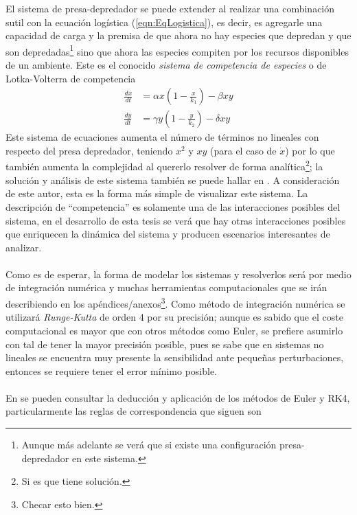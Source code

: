 El sistema de presa-depredador se puede extender al realizar una combinación sutil con la ecuación logística (\ref{eqn:EqLogistica}), es decir, es agregarle una capacidad de carga y la premisa de que ahora no hay especies que depredan y que son depredadas\footnote{Aunque más adelante se verá que si existe una configuración presa-depredador en este sistema.} sino que ahora las especies compiten por los recursos disponibles de un ambiente. Este es el conocido \textit{sistema de competencia de especies} o de Lotka-Volterra de competencia
\begin{equation}\label{eqn:CompentenciaEspecies2x2}
	\begin{split}
		\frac{dx}{dt} &= \alpha x\left (1-\frac{x}{k_1}\right )-\beta xy\\
		\frac{dy}{dt} &= \gamma y\left (1-\frac{y}{k_2}\right )-\delta xy
	\end{split}
\end{equation}
Este sistema de ecuaciones aumenta el número de términos no lineales con respecto del presa depredador, teniendo $x^2$ y $xy$ (para el caso de $\dot{x}$) por lo que también aumenta la complejidad al quererlo resolver de forma analítica\footnote{Si es que tiene solución.}; la solución y análisis de este sistema también se puede hallar en \cite{hirsch2013differential}. A consideración de este autor, esta es la forma más simple de visualizar este sistema. La descripción de ``competencia'' es solamente una de las interacciones posibles del sistema, en el desarrollo de esta tesis se verá que hay otras interacciones posibles que enriquecen la dinámica del sistema y producen escenarios interesantes de analizar.\\
\\
Como es de esperar, la forma de modelar los sistemas y resolverlos será por medio de integración numérica y muchas herramientas computacionales que se irán describiendo en los apéndices/anexos\footnote{Checar esto bien.}. Como método de integración numérica se utilizará \textit{Runge-Kutta} de orden 4 por su precisión; aunque es sabido que el coste computacional es mayor que con otros métodos como Euler, se prefiere asumirlo con tal de tener la mayor precisión posible, pues se sabe que en sistemas no lineales se encuentra muy presente la sensibilidad ante pequeñas perturbaciones, entonces se requiere tener el error mínimo posible.\\
\\
En \cite{stickler2016basic} se pueden consultar la deducción y aplicación de los métodos de Euler y RK4, particularmente las reglas de correspondencia que siguen son 
